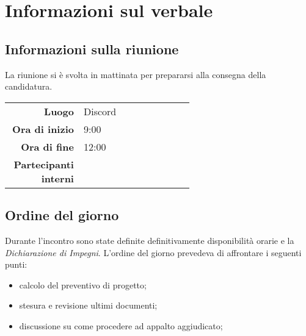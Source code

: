 \section{Informazioni sul verbale}

\subsection{Informazioni sulla riunione}
La riunione si è svolta in mattinata per prepararsi alla consegna della candidatura.

\begin{center}
	\begin{tabular}{r|p{0.6\linewidth}}
		\toprule
		\textbf{Luogo} & Discord \\
		\textbf{Ora di inizio} & 9:00 \\
		\textbf{Ora di fine} & 12:00 \\
		\textbf{Partecipanti interni} & \groupTeam
	\end{tabular}
\end{center}

\medskip

\subsection{Ordine del giorno}
Durante l'incontro sono state definite definitivamente disponibilità orarie e la \textit{Dichiarazione di Impegni}. L'ordine del giorno prevedeva di affrontare i seguenti punti:
\begin{itemize}
	\item calcolo del preventivo di progetto;
	\item stesura e revisione ultimi documenti;
	\item discussione su come procedere ad appalto aggiudicato;
\end{itemize}
